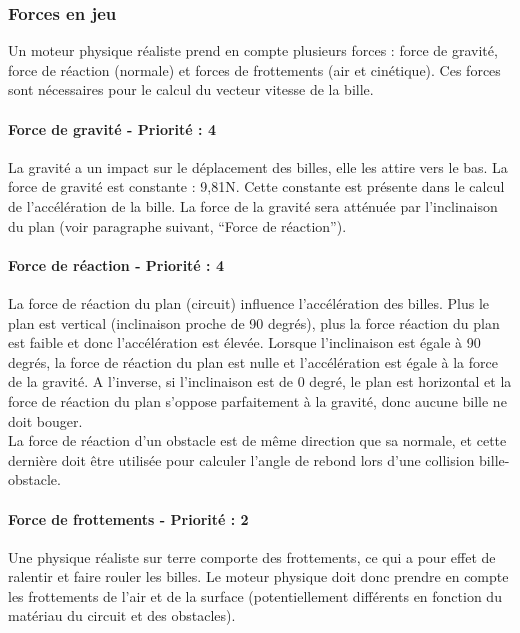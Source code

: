 \documentclass{report}
\begin{document}
\newpage
\subsubsection{Forces en jeu}

Un moteur physique réaliste prend en compte plusieurs forces : force de gravité, force de réaction (normale) et forces de frottements (air et cinétique). Ces forces sont nécessaires pour le calcul du vecteur vitesse de la bille.

\paragraph{Force de gravité - Priorité : 4}

La gravité a un impact sur le déplacement des billes, elle les attire vers le bas. La force de gravité est constante : 9,81N. Cette constante est présente dans le calcul de l’accélération de la bille. La force de la gravité sera atténuée par l’inclinaison du plan (voir paragraphe suivant, “Force de réaction”). 

\paragraph{Force de réaction - Priorité : 4}

La force de réaction du plan (circuit) influence l’accélération des billes. Plus le plan est vertical (inclinaison proche de 90 degrés), plus la force réaction du plan est faible et donc l’accélération est élevée. Lorsque l’inclinaison est égale à 90 degrés, la force de réaction du plan est nulle et l’accélération est égale à la force de la gravité. A l’inverse, si l’inclinaison est de 0 degré, le plan est horizontal et la force de réaction du plan s’oppose parfaitement à la gravité, donc aucune bille ne doit bouger. \\

La force de réaction d’un obstacle est de même direction que sa normale, et cette dernière doit être utilisée pour calculer l’angle de rebond lors d’une collision bille-obstacle. 


\paragraph{Force de frottements - Priorité : 2}

Une physique réaliste sur terre comporte des frottements, ce qui a pour effet de ralentir et faire rouler les billes.  Le moteur physique doit donc prendre en compte les frottements de l’air et de la surface (potentiellement différents en fonction du matériau du circuit et des obstacles).
\end{document}
